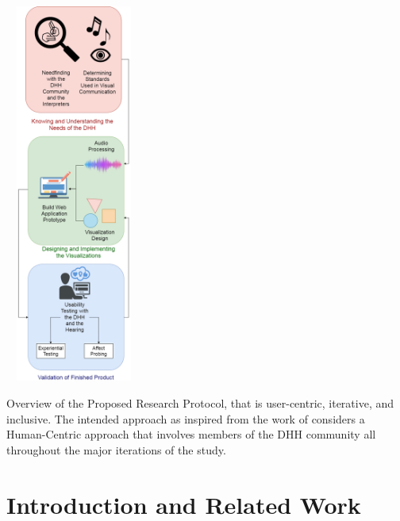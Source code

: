 \documentclass{sigchi-ext}
\begin{document}

\printccsdesc

\begin{marginfigure}[-1pc]
\begin{minipage}{\marginparwidth}
     \centering
    \includegraphics[width=4.5cm,height=12.5cm]{figures/newSystemDesignFlowchart.png}
    \caption{Overview of the Proposed Research Protocol, that is user-centric, iterative, and inclusive. The intended approach as inspired from the work of \protect\cite{deja2019myosl} considers a Human-Centric approach that involves members of the DHH community all throughout the major iterations of the study.}
    \label{fig:methodology}
    \end{minipage}
\end{marginfigure}

\section{Introduction and Related Work}
\end{document}
